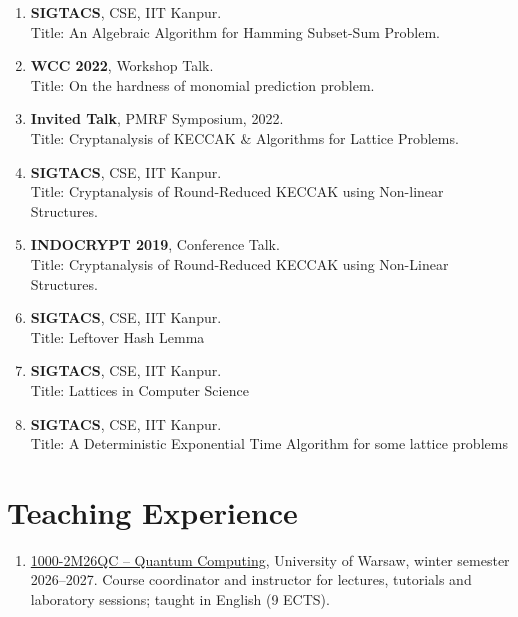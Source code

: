 \documentclass[margin]{res} %
\begin{document}
\begin{resume}
\begin{enumerate}
    \item \textbf{SIGTACS}, CSE, IIT Kanpur.\\
    Title: An Algebraic Algorithm for Hamming Subset-Sum Problem.
    
    \item \textbf{WCC 2022}, Workshop Talk.\\
    Title: On the hardness of monomial prediction problem.
    
    \item \textbf{Invited Talk}, PMRF Symposium, 2022.\\
    Title: Cryptanalysis of KECCAK \& Algorithms for Lattice Problems.
    
    \item \textbf{SIGTACS}, CSE, IIT Kanpur.\\
    Title: Cryptanalysis of Round-Reduced KECCAK using Non-linear Structures.
    
    \item \textbf{INDOCRYPT 2019}, Conference Talk.\\
    Title: Cryptanalysis of Round-Reduced KECCAK using Non-Linear Structures.
    
    \item \textbf{SIGTACS}, CSE, IIT Kanpur.\\
    Title: Leftover Hash Lemma
    
    \item \textbf{SIGTACS}, CSE, IIT Kanpur.\\
    Title: Lattices in Computer Science
    
    \item \textbf{SIGTACS}, CSE, IIT Kanpur.\\
    Title: A Deterministic Exponential Time Algorithm for some lattice problems
    
    
\end{enumerate}

\section{Teaching Experience}
\begin{enumerate}
    \item \href{https://informatorects.uw.edu.pl/en/courses/view?prz_kod=1000-2M26QC}{1000-2M26QC -- Quantum Computing}, University of Warsaw, winter semester 2026--2027. Course coordinator and instructor for lectures, tutorials and laboratory sessions; taught in English (9 ECTS).


\end{enumerate}
\end{resume}
\end{document}
